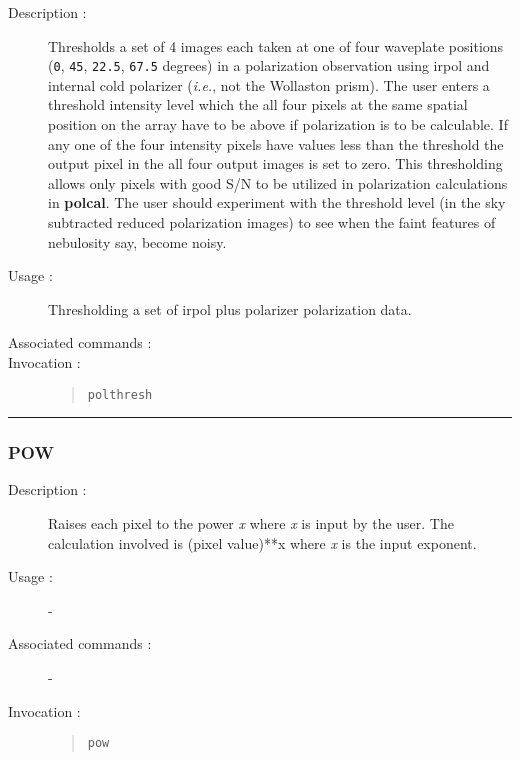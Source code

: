 \begin{description}

\item[Description :] Thresholds a set of 4 images each taken at one of
four waveplate positions ({\tt 0}, {\tt 45}, {\tt 22.5}, {\tt 67.5}
degrees) in a polarization observation using {\sc irpol} and internal
cold polarizer (\emph{i.e.}, not the Wollaston prism).  The user enters
a threshold intensity level which the all four pixels at the same
spatial position on the array have to be above if polarization is to be
calculable.  If any one of the four intensity pixels have values less
than the threshold the output pixel in the all four output images is
set to zero.  This thresholding allows only pixels with good S/N to be
utilized in polarization calculations in {\bf polcal}. The user should
experiment with the threshold level (in the sky subtracted reduced
polarization images) to see when the faint features of nebulosity say,
become noisy.

\item[Usage :] Thresholding a set of {\sc irpol} plus polarizer 
polarization data.
\item[Associated commands :] {\tt {}}
\item[Invocation :]

\begin{quote}{\tt  polthresh }\end{quote}

\end{description}

\hrule 
\subsubsection*{\label{POW}POW}

\begin{description}

\item[Description :] Raises each pixel to the power {\it x} where {\it
x} is input by the user. The calculation involved is (pixel value)**x
where {\it x} is the input exponent.

\item[Usage :] -
\item[Associated commands :] -
\item[Invocation :]

\begin{quote}{\tt  pow }\end{quote}

\end{description}

